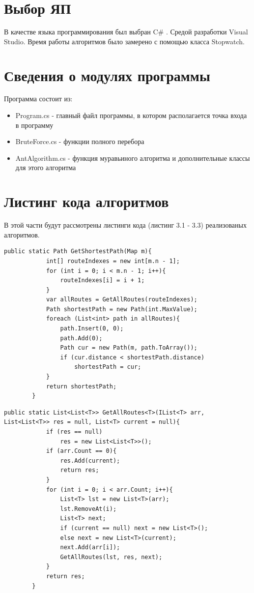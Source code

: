 \documentclass[12pt]{report}
\begin{document}
\section{Выбор ЯП}
В качестве языка программирования был выбран C\# \cite{Microsoft}. Средой разработки Visual Studio. 
Время работы алгоритмов было замерено с помощью класса Stopwatch. 

\section{Сведения о модулях программы}
Программа состоит из:
\begin{itemize}
	\item Program.cs - главный файл программы, в котором располагается точка входа в программу
	\item BruteForce.cs - функции полного перебора
	\item AntAlgorithm.cs - функция муравьиного алгоритма и дополнительные классы для этого алгоритма
\end{itemize}


\section{Листинг кода алгоритмов}
В этой части будут рассмотрены листинги кода (листинг 3.1 - 3.3) реализованых алгоритмов.
\begin{lstlisting}[label=some-code,caption=Алгоритм поиска полным перебором]
public static Path GetShortestPath(Map m){
            int[] routeIndexes = new int[m.n - 1];
            for (int i = 0; i < m.n - 1; i++){
                routeIndexes[i] = i + 1;
            }
            var allRoutes = GetAllRoutes(routeIndexes);
            Path shortestPath = new Path(int.MaxValue);
            foreach (List<int> path in allRoutes){
                path.Insert(0, 0);
                path.Add(0);
                Path cur = new Path(m, path.ToArray());
                if (cur.distance < shortestPath.distance)
                    shortestPath = cur;
            }
            return shortestPath;
        }
\end{lstlisting}

\begin{lstlisting}[label=some-code,caption=Алгоритм поиска всех перестановок]
public static List<List<T>> GetAllRoutes<T>(IList<T> arr, List<List<T>> res = null, List<T> current = null){
            if (res == null)
                res = new List<List<T>>();
            if (arr.Count == 0){
                res.Add(current);
                return res;
            }
            for (int i = 0; i < arr.Count; i++){
                List<T> lst = new List<T>(arr);
                lst.RemoveAt(i);
                List<T> next;
                if (current == null) next = new List<T>();
                else next = new List<T>(current);
                next.Add(arr[i]);
                GetAllRoutes(lst, res, next);
            }
            return res;
        }
\end{lstlisting}
\end{document}
